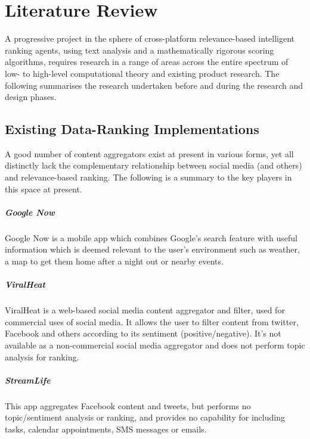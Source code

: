 \chapter{Literature Review}

A progressive project in the sphere of cross-platform relevance-based intelligent ranking agents, using text analysis and a mathematically rigorous scoring algorithms, requires research in a range of areas across the entire spectrum of low- to high-level computational theory and existing product research. The following summarises the research undertaken before and during the research and design phases.

\section{Existing Data-Ranking Implementations}

A good number of content aggregators exist at present in various forms, yet all distinctly lack the complementary relationship between social media (and others) and relevance-based ranking. The following is a summary to the key players in this space at present.

\paragraph{Google Now}
Google Now is a mobile app which combines Google's search feature with useful information which is deemed relevant to the user's environment such as weather, a map to get them home after a night out or nearby events.

\paragraph{ViralHeat}
ViralHeat is a web-based social media content aggregator and filter, used for commercial uses of social media. It allows the user to filter content from twitter, Facebook and others according to its sentiment (positive/negative). It's not available as a non-commercial social media aggregator and does not perform topic analysis for ranking.

\paragraph{StreamLife}
This app aggregates Facebook content and tweets, but performs no topic/sentiment analysis or ranking, and provides no capability for including tasks, calendar appointments, SMS messages or emails.

